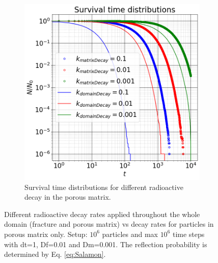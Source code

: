 \documentclass{article}
\begin{document}
\begin{figure}[htbp]
\begin{subfigure}[b]{0.48\textwidth}
        \includegraphics[width=\textwidth]{images/survTimeDistMatrixDecay.png}
        \caption{Survival time distributions for different radioactive decay in the porous matrix.}
    \end{subfigure}
    \caption{Different radioactive decay rates applied throughout the whole domain (fracture and porous matrix) vs decay rates for particles in porous matrix only. Setup: $10^6$ particles and max $10^6$ time steps with dt=1, Df=0.01 and Dm=0.001. The reflection probability is determined by Eq. \ref{eq:Salamon}.}
    \label{fig:survTimeDistMatrixDecay}
\end{figure}
\end{document}
